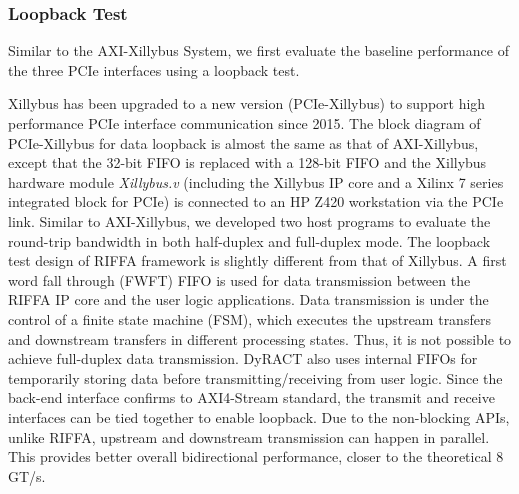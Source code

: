 \subsubsection{Loopback Test}
Similar to the AXI-Xillybus System, we first evaluate the baseline performance of the three PCIe interfaces using a loopback test. 

Xillybus has been upgraded to a new version (PCIe-Xillybus) to support high performance PCIe interface communication since 2015. 
The block diagram of PCIe-Xillybus for data loopback is almost the same as that of AXI-Xillybus, except that the 32-bit FIFO is replaced with a 128-bit FIFO and the Xillybus hardware module \textit{Xillybus.v} (including the Xillybus IP core and a Xilinx 7 series integrated block for PCIe) is connected to an HP Z420 workstation via the PCIe link. 
Similar to AXI-Xillybus, we developed two host programs to evaluate the round-trip bandwidth in both half-duplex and full-duplex mode. 
The loopback test design of RIFFA framework is slightly different from that of Xillybus. 
A first word fall through (FWFT) FIFO is used for data transmission between the RIFFA IP core and the user logic applications. 
Data transmission is under the control of a finite state machine (FSM), which executes the upstream transfers and downstream transfers in different processing states.  
Thus, it is not possible to achieve full-duplex data transmission. 
DyRACT also uses internal FIFOs for temporarily storing data before transmitting/receiving from user logic.
Since the back-end interface confirms to AXI4-Stream standard, the transmit and receive interfaces can be tied together to enable loopback.
Due to the non-blocking APIs, unlike RIFFA, upstream and downstream transmission can happen in parallel.
This provides better overall bidirectional performance, closer to the theoretical 8 GT/s.


